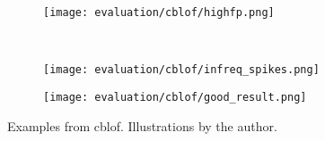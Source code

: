 \begin{figure}[htp!]
    \begin{subfigure}[b]{\linewidth}
        \centering
        \texttt{[image: evaluation/cblof/highfp.png]}
        \label{fig:cblof-fp}
    \end{subfigure}%
    \\
    \begin{subfigure}[b]{\linewidth}
        \centering
        \texttt{[image: evaluation/cblof/infreq\_spikes.png]}
        \label{fig:cblof-cyclicity}
    \end{subfigure}
\end{figure}

\begin{figure}[htp!]
    \ContinuedFloat{}
    \begin{subfigure}[b]{\linewidth}
        \centering
        \texttt{[image: evaluation/cblof/good\_result.png]}
        \label{fig:cblof-good}
    \end{subfigure}
\caption[Examples from \gls{cblof}.]{Examples from \gls{cblof}. Illustrations by the author.}\label{fig:cblof-output}
\end{figure}


